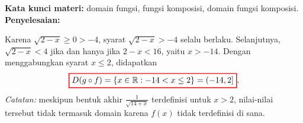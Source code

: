 \documentclass[10pt,openany,a4paper]{article}
\theoremstyle{definition}
\theoremstyle{definition}
\theoremstyle{plain}
\newenvironment{jawab}[2][tes]{%
\par\noindent\textbf{Kata kunci materi:} #1.\\
\textbf{Penyelesaian:} #2%
}{}
\begin{document}
\begin{enumerate}
\begin{jawab}[domain fungsi, fungsi komposisi, domain fungsi komposisi]
{\begin{enumerate}
            Karena $\sqrt{2-x}\geq 0>-4$, syarat $\sqrt{2-x}>-4$ selalu berlaku. Selanjutnya, $\sqrt{2-x}<4$ jika dan hanya jika $2-x<16$, yaitu $x>-14$. Dengan menggabungkan syarat $x\leq 2$, didapatkan
            \begin{align*}
                \colorlet{oldcolor}{.}
        \color{red}
        \setlength{\fboxrule}{1pt} \boxed{\color{oldcolor}D(g\circ f) = \{x\in\mathbb{R} : -14<x\leq 2\} = (-14,2]}\color{oldcolor}.
            \end{align*}
            \textit{Catatan:} meskipun bentuk akhir $\frac{1}{\sqrt{14+x}}$ terdefinisi untuk $x>2$, nilai-nilai tersebut tidak termasuk domain karena $f(x)$ tidak terdefinisi di sana.
        \end{enumerate}
    }
    \end{jawab}


\end{enumerate}
\end{document}
